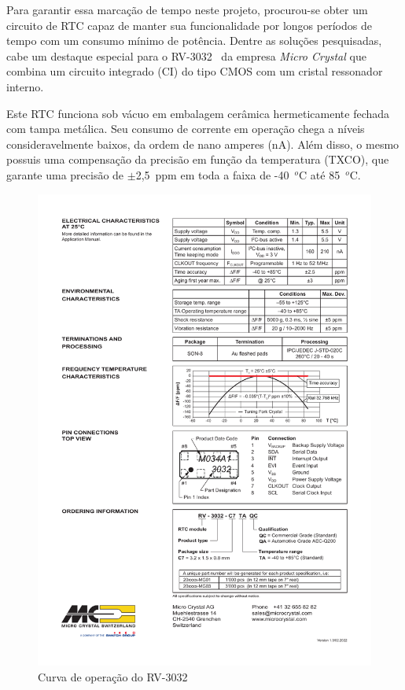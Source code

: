 Para garantir essa marcação de tempo neste projeto, procurou-se obter um circuito de RTC capaz de manter sua funcionalidade por longos períodos de tempo com um consumo mínimo de potência. Dentre as soluções pesquisadas, cabe um destaque especial para o RV-3032~\cite{rtc} da empresa \textit{Micro Crystal} que combina um circuito integrado (CI) do tipo CMOS com um cristal ressonador interno. 

Este RTC funciona sob vácuo em embalagem cerâmica hermeticamente fechada com tampa metálica. Seu consumo de corrente em operação chega a níveis consideravelmente baixos, da ordem de nano amperes (nA). Além disso, o mesmo possuis uma compensação da precisão em função da temperatura (TXCO), que garante uma precisão de $\pm$2,5~ppm em toda a faixa de -40~$^o$C até 85~$^o$C.

\begin{figure}[h!]
  \caption{Curva de operação do RV-3032}
  \begin{center}
      \includegraphics[scale=0.8]{img/RTCcurva.pdf}
  \end{center}
  \label{fig:RTC}
\end{figure}

